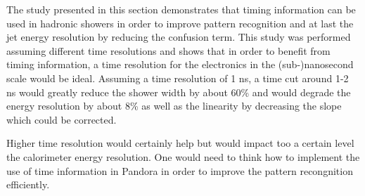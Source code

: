 The study presented in this section demonstrates that timing information can be used in hadronic showers in order to improve pattern recognition and at last the jet energy resolution by reducing the confusion term. This study was performed assuming different time resolutions and shows that in order to benefit from timing information, a time resolution for the electronics in the (sub-)nanosecond scale would be ideal. Assuming a time resolution of 1 ns, a time cut around 1-2 ns would greatly reduce the shower width by about 60\% and would degrade the energy resolution by about 8\% as well as the linearity by decreasing the slope which could be corrected.

Higher time resolution would certainly help but would impact too a certain level the calorimeter energy resolution. One would need to think how to implement the use of time information in Pandora in order to improve the pattern recongnition efficiently.
